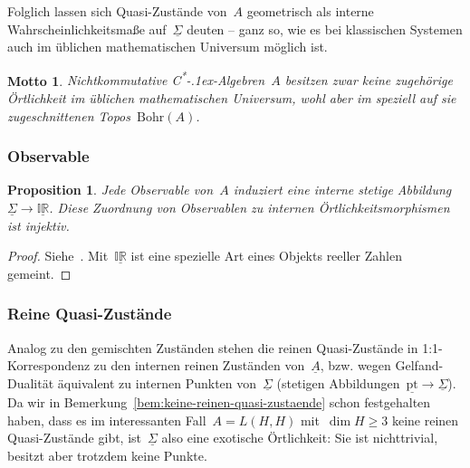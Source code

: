 \documentclass[a4paper,ngerman,12pt]{scrartcl}
\theoremstyle{definition}
\theoremstyle{plain}
\newtheorem{prop}[defn]{Proposition}
\newtheorem{motto}[defn]{Motto}
\theoremstyle{remark}
\newcommand{\CC}{\mathbb{C}}
\newcommand{\C}{\mathcal{C}}
\newcommand{\Bohr}{\mathrm{Bohr}}
\newcommand{\pt}{\mathrm{pt}}
\newcommand{\ul}[1]{\underline{#1}}
\newcommand{\csalgebren}{C\textsuperscript{*}\kern-.1ex-Alge\-bren}
\renewcommand{\_}{\mathpunct{.}\,}
\newcommand{\?}{\,{:}\,}
\begin{document}
Folglich lassen sich Quasi-Zustände von~$A$ geometrisch als interne
Wahrscheinlichkeitsmaße auf~$\ul{\Sigma}$ deuten -- ganz so, wie es bei
klassischen Systemen auch im üblichen mathematischen Universum möglich ist.

\begin{motto}Nichtkommutative \csalgebren~$A$ besitzen zwar keine zugehörige
Örtlichkeit im üblichen mathematischen Universum, wohl aber im speziell auf sie
zugeschnittenen Topos~$\Bohr(A)$.\end{motto}


\subsubsection*{Observable}

\begin{prop}Jede Observable von~$A$ induziert eine interne stetige
Abbildung~$\ul{\Sigma} \to \ul{\mathbb{IR}}$. Diese Zuordnung von Observablen
zu internen Örtlichkeitsmorphismen ist
injektiv.\end{prop}
\begin{proof}Siehe~\cite[Prop.~15]{topos:aqt}. Mit~$\ul{\mathbb{IR}}$ ist eine
spezielle Art eines Objekts reeller Zahlen gemeint.\end{proof}



\subsubsection*{Reine Quasi-Zustände}

Analog zu den gemischten Zuständen stehen die reinen Quasi-Zustände in
1:1-Kor\-res\-pon\-denz zu 
den internen reinen Zuständen von~$\ul{A}$, bzw. wegen Gelfand-Dualität
äquivalent zu internen Punkten von~$\ul{\Sigma}$ (stetigen
Abbildungen~$\ul{\pt} \to \ul{\Sigma}$). Da wir in
Bemerkung~\ref{bem:keine-reinen-quasi-zustaende} schon festgehalten haben, dass es im
interessanten Fall~$A = L(H,H)$ mit~$\dim H \geq 3$ keine reinen Quasi-Zustände
gibt, ist~$\ul{\Sigma}$ also eine exotische Örtlichkeit: Sie ist nichttrivial,
besitzt aber trotzdem keine Punkte.


\end{document}
